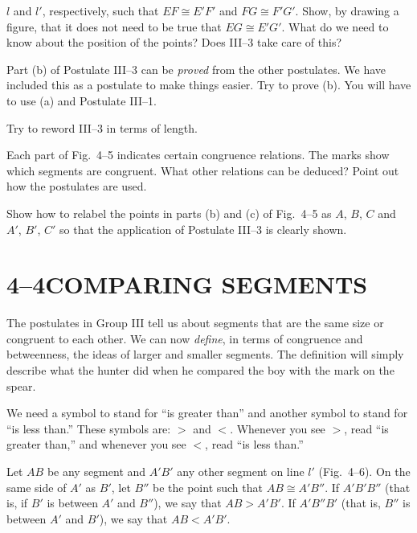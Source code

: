 \documentclass[11pt]{book}
\begin{document}
\begin{exercisecols}
\begin{exlist}
      $l$ and $l'$, respectively, such that $EF \cong E'F'$ and
      $FG \cong F'G'$. Show, by drawing a figure, that it does not need to be
      true that $EG \cong E'G'$. What do we need to know about the position of
      the points? Does III--3 take care of this?
\item[\stex 13.] Part (b) of Postulate III--3 can be \emph{proved} from the
      other postulates. We have included this as a postulate to make things
      easier. Try to prove (b). You will have to use (a) and Postulate III--1.
\item[\stex 14.] Try to reword III--3 in terms of length.
\item[15.] Each part of Fig.~4--5 indicates certain congruence relations. The
      marks show which segments are congruent. What other relations can be
      deduced? Point out how the postulates are used.
\exfig{\FIGIVFIVE}
\item[\stex 16.] Show how to relabel the points in parts (b) and (c) of
      Fig.~4--5 as $A$, $B$, $C$ and $A'$, $B'$, $C'$ so that the application of
      Postulate III--3 is clearly shown.
\end{exlist}
\end{exercisecols}

\section*{4--4\quad COMPARING SEGMENTS}

The postulates in Group III tell us about segments that are the same size or
congruent to each other. We can now \emph{define}, in terms of congruence and
betweenness, the ideas of larger and smaller segments. The definition will simply
describe what the hunter did when he compared the boy with the mark on the spear.

We need a symbol to stand for ``is greater than'' and another symbol to stand for
``is less than.'' These symbols are: $>$ and $<$. Whenever you see $>$, read
``is greater than,'' and whenever you see $<$, read ``is less than.''

\begin{definition}
Let $AB$ be any segment and $A'B'$ any other segment on line $l'$ (Fig.~4--6). On
the same side of $A'$ as $B'$, let $B''$ be the point such that
$AB \cong A'B''$. If $A'B'B''$ (that is, if $B'$ is between $A'$ and $B''$), we
say that $AB > A'B'$. If $A'B''B'$ (that is, $B''$ is between $A'$ and $B'$), we
say that $AB < A'B'$.
\end{definition}
\end{document}

